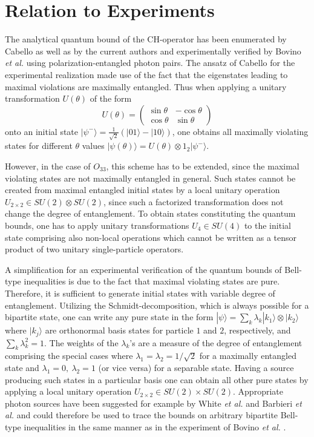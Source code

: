 \documentclass[pra,amsmath,amsfonts,showkeys,showpacs,preprint]{revtex4}
\begin{document}
\section{Relation to Experiments}

The analytical quantum bound of the CH-operator has been
enumerated by Cabello \cite{cabello04} as well as by the current authors
\cite{filipp-svozil04a} and experimentally verified by
Bovino \emph{et al.} \cite{bovino04} using polarization-entangled
photon pairs.
 The ansatz of Cabello for the experimental realization made use
of the fact that the eigenstates leading to maximal violations are
maximally entangled. Thus when applying a unitary transformation $U(\theta)$ of the form
$$U(\theta) = \left(\begin{array}{cc}\sin\theta & -\cos\theta\\\cos\theta & \sin\theta
  \end{array}\right)$$
onto an initial state
$|{\psi^-}\rangle=\frac{1}{\sqrt{2}}(|{01}\rangle-|{10}\rangle)$,
one obtains all maximally violating states for different $\theta$
values $|{\psi(\theta)}\rangle = U(\theta)\otimes
1_2 |{\psi^-}\rangle$.

However, in the case of $O_{33}$,  this scheme has to be extended, since
the maximal violating states are not maximally entangled in general.
Such states cannot be created from maximal entangled initial states
by a local unitary
operation $U_{2\times 2} \in SU(2) \otimes SU(2)$,
since such a factorized transformation does not change the degree of
entanglement.
To obtain states constituting the quantum bounds, one has to apply unitary transformations
$U_4 \in SU(4)$ to the initial state comprising also non-local operations which  cannot be written as a
tensor product of two unitary single-particle operators.

A simplification for an experimental verification of the quantum bounds of
Bell-type inequalities is due to the fact that maximal violating
states are pure.
Therefore, it is sufficient to generate initial
states with variable degree of entanglement. Utilizing the
Schmidt-decomposition, which is always possible for a bipartite state,
one can write any pure state in the form $|{\psi} \rangle= \sum_k \lambda_k
|{k_1}\rangle \otimes |{k_2}\rangle$ where $|{k_j}\rangle$ are orthonormal basis
states for particle $1$ and $2$, respectively, and $\sum_k \lambda_k^2 =
1$. The weights of the $\lambda_k$'s are a measure of the degree
of entanglement comprising the special cases where $\lambda_1 =
\lambda_2 = 1/\sqrt{2}$ for a maximally entangled state and $\lambda_1
= 0,\ \lambda_2 = 1$ (or vice versa) for a separable state. Having a
source producing such states in a particular basis one can obtain all
other pure states by applying a local unitary operation
$U_{2\times 2} \in SU(2) \times SU(2)$. Appropriate photon sources have been
suggested for example by White \emph{et al.} \cite{White:1999} and Barbieri
\emph{et al.} \cite{barbieri04} and could therefore be used to trace the bounds
on arbitrary bipartite Bell-type inequalities in the same manner as in
the experiment of Bovino \emph{et al.} \cite{bovino04}.
\end{document}
